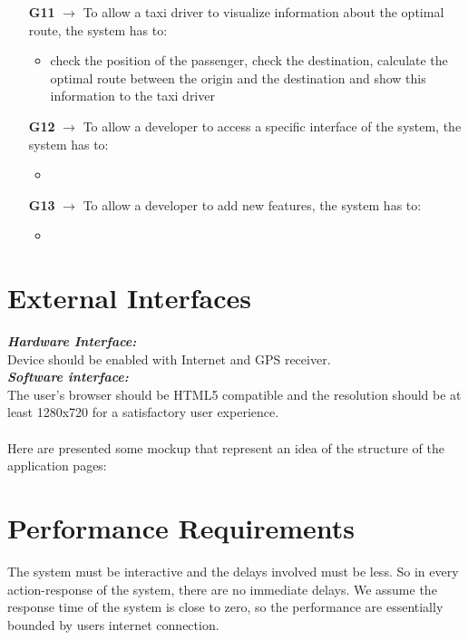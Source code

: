 \begin{itemize}
	\item [\textbf{G11}] $\rightarrow$ To allow a taxi driver to visualize information about the optimal route, the system has to:
	\begin{itemize}
		\item check the position of the passenger, check the destination, calculate the optimal route between the origin and the destination and show this information to the taxi driver
	\end{itemize}
	
	\item [\textbf{G12}] $\rightarrow$ To allow a developer to access a specific interface of the system, the system has to:
	\begin{itemize}
		\item
	\end{itemize}

	\item [\textbf{G13}] $\rightarrow$ To allow a developer to add new features, the system has to:
	\begin{itemize}
		\item
	\end{itemize}
\end{itemize}

\section{External Interfaces}
\textit{\textbf{Hardware Interface:}}\\
Device should be enabled with Internet and GPS receiver.\\
\textit{\textbf{Software interface:}}\\
The user's browser should be HTML5 compatible and the resolution should be at least 1280x720 for a satisfactory user experience.\\
\\
Here are presented some mockup that represent an idea of the structure of the application pages:

\section{Performance Requirements}
The system must be interactive and the delays involved must be less. So in every action-response of the system, there are no immediate delays. We assume the response time of the system is close to zero, so the performance are essentially bounded by users internet connection.

